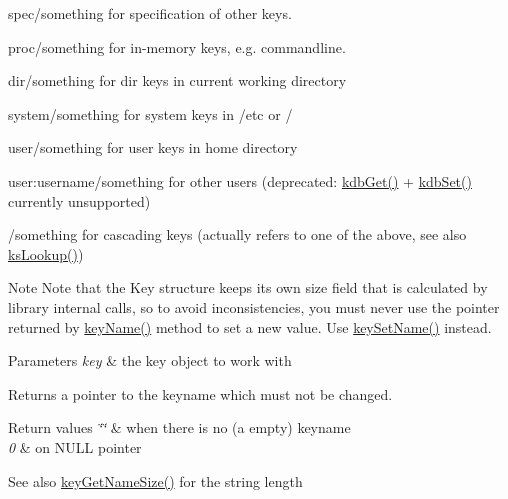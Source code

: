 \begin{DoxyItemize}
\item {\ttfamily spec/something} for specification of other keys.
\item {\ttfamily proc/something} for in-\/memory keys, e.\+g. commandline.
\item {\ttfamily dir/something} for dir keys in current working directory
\item {\ttfamily system/something} for system keys in /etc or /
\item {\ttfamily user/something} for user keys in home directory
\item {\ttfamily user\+:username/something} for other users (deprecated\+: \hyperlink{group__kdb_ga28e385fd9cb7ccfe0b2f1ed2f62453a1}{kdb\+Get()} + \hyperlink{group__kdb_ga11436b058408f83d303ca5e996832bcf}{kdb\+Set()} currently unsupported)
\item {\ttfamily /something} for cascading keys (actually refers to one of the above, see also \hyperlink{group__keyset_gaa34fc43a081e6b01e4120daa6c112004}{ks\+Lookup()})

\begin{DoxyNote}{Note}
Note that the Key structure keeps its own size field that is calculated by library internal calls, so to avoid inconsistencies, you must never use the pointer returned by \hyperlink{group__keyname_ga8e805c726a60da921d3736cda7813513}{key\+Name()} method to set a new value. Use \hyperlink{group__keyname_ga7699091610e7f3f43d2949514a4b35d9}{key\+Set\+Name()} instead.
\end{DoxyNote}

\begin{DoxyParams}{Parameters}
{\em key} & the key object to work with \\
\hline
\end{DoxyParams}
\begin{DoxyReturn}{Returns}
a pointer to the keyname which must not be changed. 
\end{DoxyReturn}

\begin{DoxyRetVals}{Return values}
{\em \char`\"{}\char`\"{}} & when there is no (a empty) keyname \\
\hline
{\em 0} & on N\+U\+L\+L pointer \\
\hline
\end{DoxyRetVals}
\begin{DoxySeeAlso}{See also}
\hyperlink{group__keyname_gabdbcfa51ed8a387e47ead207affa2d2e}{key\+Get\+Name\+Size()} for the string length 


\end{DoxySeeAlso}
\end{DoxyItemize}

